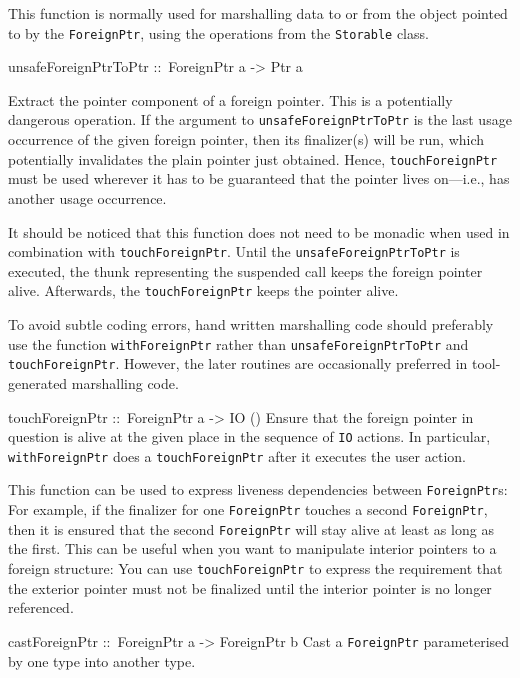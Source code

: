\documentclass[a4paper,twoside]{article}
\makeatletter
\newcommand{\code}[1]{\texttt{#1}}      %
\newenvironment{codedesc}{%
  \list{}{\labelwidth\z@
    \let\makelabel\codedesclabel}
  }{%
  \endlist
  }
\newcommand*{\codedesclabel}[1]{%
  \hspace{-\leftmargin}
  \parbox[b]{\labelwidth}{\makebox[0pt][l]{\code{#1}}\\}\hfil\relax
  }
\makeatother
\begin{document}
\begin{codedesc}
  This function is normally used for marshalling data to or from the object
  pointed to by the \code{ForeignPtr}, using the operations from the
  \code{Storable} class.

\item[unsafeForeignPtrToPtr ::\ ForeignPtr a -> Ptr a]
  
  Extract the pointer component of a foreign pointer. This is a potentially
  dangerous operation.  If the argument to \code{unsafeForeignPtrToPtr} is the
  last usage occurrence of the given foreign pointer, then its finalizer(s)
  will be run, which potentially invalidates the plain pointer just obtained.
  Hence, \code{touchForeignPtr} must be used wherever it has to be guaranteed
  that the pointer lives on---i.e., has another usage occurrence.
  
  It should be noticed that this function does not need to be monadic when
  used in combination with \code{touchForeignPtr}.  Until the
  \code{unsafeForeignPtrToPtr} is executed, the thunk representing the
  suspended call keeps the foreign pointer alive.  Afterwards, the
  \code{touchForeignPtr} keeps the pointer alive.
  
  To avoid subtle coding errors, hand written marshalling code should
  preferably use the function \code{withForeignPtr} rather than
  \code{unsafeForeignPtrToPtr} and \code{touchForeignPtr}. However, the later
  routines are occasionally preferred in tool-generated marshalling code.
  
\item[touchForeignPtr ::\ ForeignPtr a -> IO ()] Ensure that the foreign
  pointer in question is alive at the given place in the sequence of \code{IO}
  actions. In particular, \code{withForeignPtr} does a \code{touchForeignPtr}
  after it executes the user action.
  
  This function can be used to express liveness dependencies between
  \code{ForeignPtr}s: For example, if the finalizer for one \code{ForeignPtr}
  touches a second \code{ForeignPtr}, then it is ensured that the second
  \code{ForeignPtr} will stay alive at least as long as the first. This can be
  useful when you want to manipulate interior pointers to a foreign structure:
  You can use \code{touchForeignPtr} to express the requirement that the
  exterior pointer must not be finalized until the interior pointer is no
  longer referenced.
    
\item[castForeignPtr ::\ ForeignPtr a -> ForeignPtr b] Cast a
  \code{ForeignPtr} parameterised by one type into another type.
\end{codedesc}
\end{document}
